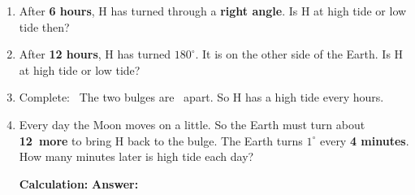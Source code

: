 \documentclass[12pt,a4paper]{article}
\newif\iffr
\newcommand{\fr}[1]{\unskip\iffr\par\nobreak\vspace{1pt}\noindent{\small\itshape\color{black!60}#1}\par\fi}
\newcommand{\frl}[2]{\iffr#2\else#1\fi}
\newcommand{\dg}{^{\circ}}
\newcommand{\calcans}[1][6.6cm]{\par\nobreak\vspace{\frl{3pt}{5pt}}\noindent\hspace*{1.6em}%
  \textbf{Calculation:} \blank[#1] \hfill \textbf{Answer:} \blank[3.0cm]\par}
\begin{document}
\vspace{8pt}
\begin{enumerate}[label=(\alph*), start=3, itemsep=\frl{6pt}{8pt}]
  \item After \textbf{6 hours}, H has turned through a \textbf{right angle}. Is H at
        high tide or low tide then? \hfill \blank[3.0cm]
        \fr{Apr\`es 6 heures, H a tourn\'e d'un angle droit. H est-il \`a mar\'ee haute
        ou \`a mar\'ee basse~?}
  \item After \textbf{12 hours}, H has turned $180\dg$. It is on the other side of
        the Earth. Is H at high tide or low tide? \hfill \blank[3.0cm]
        \fr{Apr\`es 12 heures, H a tourn\'e de $180\dg$~: il est de l'autre c\^ot\'e de
        la Terre. Mar\'ee haute ou mar\'ee basse~?}
  \item Complete: \ The two bulges are \blank[1.6cm]\textdegree\ apart. So H has a
        high tide every \blank[1.6cm] hours.
        \fr{Compl\`ete~: les deux bosses sont \`a \ldots\textdegree\ l'une de l'autre,
        donc H a une mar\'ee haute toutes les \ldots\ heures.}
  \item \begin{minipage}[t]{\linewidth}
        Every day the Moon moves on a little. So the Earth must turn about
        \textbf{12\textdegree\ more} to bring H back to the bulge. The Earth turns
        $1\dg$ every \textbf{4 minutes}. How many minutes later is high tide each
        day?
        \fr{Chaque jour, la Lune avance un peu. La Terre doit donc tourner d'environ
        12\textdegree\ de plus pour ramener H sous la bosse. La Terre tourne de
        $1\dg$ toutes les 4 minutes. Combien de minutes plus tard la mar\'ee haute
        arrive-t-elle chaque jour~?}
        \calcans
        \end{minipage}
\end{enumerate}

\end{document}
